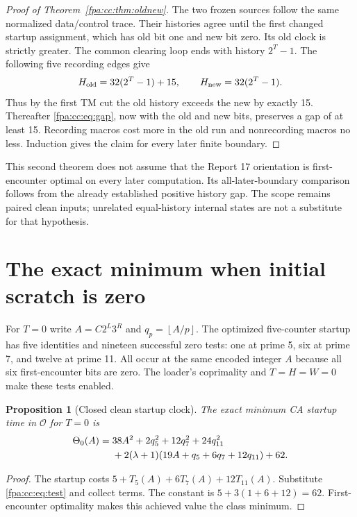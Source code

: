 \documentclass[11pt,a4paper]{article}
\numberwithin{equation}{section}
\newtheorem{proposition}[theorem]{Proposition}
\newcommand{\floor}[1]{\left\lfloor #1\right\rfloor}
\newcommand{\lam}{\lambda}
\begin{document}
\begin{proof}[Proof of Theorem~\ref{fpa:cc:thm:oldnew}]
The two frozen sources follow the same normalized data/control trace.
Their histories agree until the first changed startup assignment, which
has old bit one and new bit zero. Its old clock is strictly greater.
The common clearing loop ends with history $2^T-1$. The following five
recording edges give
\begin{equation}
 H_{\rm old}=32(2^T-1)+15,\qquad
 H_{\rm new}=32(2^T-1).
 \label{fpa:cc:eq:startup-history}
\end{equation}
Thus by the first TM cut the old history exceeds the new by exactly 15.
Thereafter \eqref{fpa:cc:eq:gap}, now with the old and new bits, preserves a gap
of at least 15. Recording macros cost more in the old run and nonrecording
macros no less. Induction gives the claim for every later finite boundary.
\end{proof}

This second theorem does not assume that the Report 17 orientation is
first-encounter optimal on every later computation. Its all-later-boundary
comparison follows from the already established positive history gap.
The scope remains paired clean inputs; unrelated equal-history internal
states are not a substitute for that hypothesis.
\newpage

\section{The exact minimum when initial scratch is zero}
\label{fpa:cc:sec:startup}
For $T=0$ write $A=C2^L3^R$ and $q_p=\floor{A/p}$. The optimized five-counter
startup has five identities and nineteen successful zero tests: one at
prime 5, six at prime 7, and twelve at prime 11. All occur at the same
encoded integer $A$ because all six first-encounter bits are zero. The
loader's coprimality and $T=H=W=0$ make these tests enabled.

\begin{proposition}[Closed clean startup clock]
The exact minimum CA startup time in $\mathcal O$ for $T=0$ is
\begin{align}
 \Theta_0(A)={}&38A^2+2q_5^2+12q_7^2+24q_{11}^2\notag\\
 &+2(\lam+1)(19A+q_5+6q_7+12q_{11})+62.
 \label{fpa:cc:eq:startupclock}
\end{align}
\end{proposition}
\begin{proof}
The startup costs $5+T_5(A)+6T_7(A)+12T_{11}(A)$. Substitute
\eqref{fpa:cc:eq:test} and collect terms. The constant is $5+3(1+6+12)=62$.
First-encounter optimality makes this achieved value the class minimum.
\end{proof}
\end{document}
